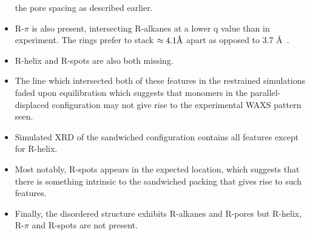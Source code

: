 \documentclass{article}
\newcommand{\angstrom}{\textup{\AA}}
\begin{document}
\begin{itemize}
	the pore spacing as described earlier.
	\item R-$\pi$ is also present, intersecting R-alkanes at a lower q value than
	in experiment. The rings prefer to stack $\approx 4.1 \angstrom$ apart as 
	opposed to 3.7 \angstrom~.
	\item R-helix and R-spots are also both missing.
	\item The line which intersected both of these features in the restrained 
	simulations faded upon equilibration which suggests that monomers in the 
	parallel-displaced configuration may not give rise to the experimental WAXS 
	pattern seen.
	\item Simulated XRD of the sandwiched configuration contains all features 
	except for R-helix.
	\item Most notably, R-spots appears in the expected location, which suggests 
	that there is something intrinsic to the sandwiched packing that gives rise 
	to such features. 
	\item Finally, the disordered structure exhibits R-alkanes and R-pores but 
	R-helix, R-$\pi$ and R-spots are not present.
  \end{itemize}
  
\end{document}
